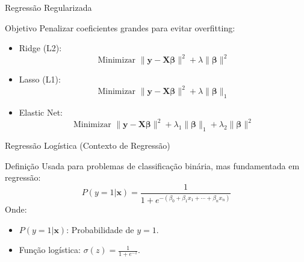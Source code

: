 \documentclass{beamer}
\begin{document}
\begin{frame}{Regressão Regularizada}
\footnotesize
  \begin{block}{Objetivo}
    Penalizar coeficientes grandes para evitar overfitting:
    \begin{itemize}
      \item Ridge (L2):
        \[
        \text{Minimizar } \|\mathbf{y} - \mathbf{X}\boldsymbol{\beta}\|^2 + \lambda \|\boldsymbol{\beta}\|^2
        \]
      \item Lasso (L1):
        \[
        \text{Minimizar } \|\mathbf{y} - \mathbf{X}\boldsymbol{\beta}\|^2 + \lambda \|\boldsymbol{\beta}\|_1
        \]
      \item Elastic Net:
        \[
        \text{Minimizar } \|\mathbf{y} - \mathbf{X}\boldsymbol{\beta}\|^2 + \lambda_1 \|\boldsymbol{\beta}\|_1 + \lambda_2 \|\boldsymbol{\beta}\|^2
        \]
    \end{itemize}
  \end{block}

\end{frame}

\begin{frame}{Regressão Logística (Contexto de Regressão)}
\footnotesize
  \begin{block}{Definição}
    Usada para problemas de classificação binária, mas fundamentada em regressão:
    \[
    P(y=1 | \mathbf{x}) = \frac{1}{1 + e^{-(\beta_0 + \beta_1 x_1 + \cdots + \beta_n x_n)}}
    \]
    Onde:
    \begin{itemize}
      \item \( P(y=1 | \mathbf{x}) \): Probabilidade de \( y = 1 \).
      \item Função logística: \( \sigma(z) = \frac{1}{1 + e^{-z}} \).
    \end{itemize}
  \end{block}

  \begin{figure}[ht]
    \centering

  \end{figure}
\end{frame}
\end{document}

